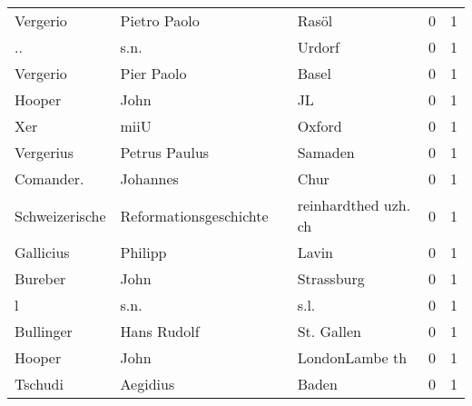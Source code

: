 \documentclass[10pt,a4paper,landscape]{article}
\begin{document}
\begin{longtable}{llllrr}
                 Vergerio &                       Pietro Paolo &             &                                       Rasöl &          0 &         1 \\
                       .. &                               s.n. &             &                                      Urdorf &          0 &         1 \\
                 Vergerio &                         Pier Paolo &             &                                       Basel &          0 &         1 \\
                   Hooper &                               John &             &                                          JL &          0 &         1 \\
                      Xer &                               miiU &             &                                      Oxford &          0 &         1 \\
                Vergerius &                      Petrus Paulus &             &                                     Samaden &          0 &         1 \\
                Comander. &                           Johannes &             &                                        Chur &          0 &         1 \\
           Schweizerische &             Reformationsgeschichte &             &                        reinhardthed uzh. ch &          0 &         1 \\
                Gallicius &                            Philipp &             &                                       Lavin &          0 &         1 \\
                  Bureber &                               John &             &                                  Strassburg &          0 &         1 \\
                        l &                               s.n. &             &                                        s.l. &          0 &         1 \\
                Bullinger &                        Hans Rudolf &             &                                  St. Gallen &          0 &         1 \\
                   Hooper &                               John &             &                              LondonLambe th &          0 &         1 \\
                  Tschudi &                           Aegidius &             &                                       Baden &          0 &         1 \\

\end{longtable}
\end{document}
